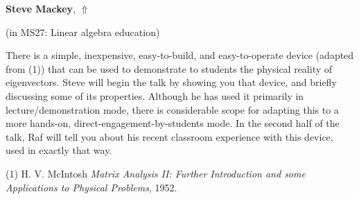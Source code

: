 \documentclass[ILAS2025-program.tex]{subfiles}
\begin{document}
\hypertarget{down0294}{}\begin{ilasabstract}
    
\textbf{Steve Mackey},  \hfill \hyperlink{up0294}{$\Uparrow$}
    
    
(in {\color{mstitle}MS27: Linear algebra education})
        
\mtskip
    There is a simple, inexpensive, easy-to-build, and easy-to-operate device 
(adapted from (1)) 
that can be used to demonstrate to students the physical reality of eigenvectors.
Steve will begin the talk by showing you that device, 
and briefly discussing some of its properties.
Although he has used it primarily in lecture/demonstration mode, 
there is considerable scope for adapting this 
to a more hands-on, direct-engagement-by-students mode.  
In the second half of the talk, 
Raf will tell you about his recent classroom experience
with this device, used in exactly that way.

(1) {H. V. McIntosh} 
{\em Matrix Analysis II: Further Introduction and some Applications to Physical Problems},  
1952.

\end{ilasabstract}
    
\end{document}
